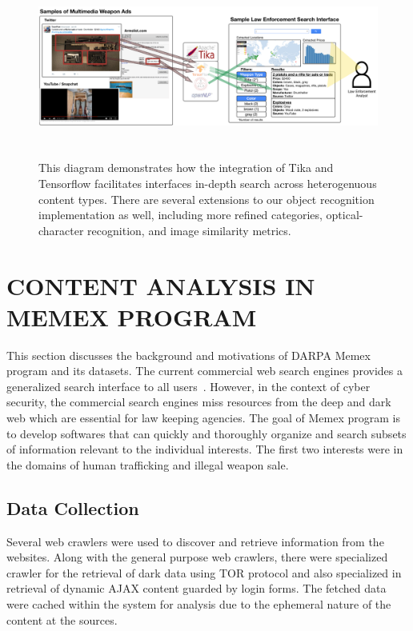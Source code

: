 \begin{figure}
	\includegraphics[width=\textwidth,height=6cm]{interface-diagram}
	\caption{This diagram demonstrates how the integration of Tika and Tensorflow facilitates interfaces in-depth search across heterogenuous content types. There are several extensions to our object recognition implementation as well, including more refined categories, optical-character recognition, and image similarity metrics.}
	\label{fig:interface-diagram}
\end{figure}

\section{CONTENT ANALYSIS IN MEMEX PROGRAM} \label{sec:memex}
This section discusses the background and motivations of DARPA Memex program and its datasets. The current commercial web search engines provides a generalized search interface to all users~\cite{}. However, in the context of cyber security, the commercial search engines miss resources from the deep and dark web which are essential for law keeping agencies. The goal of Memex program is to develop softwares that can quickly and thoroughly organize and search subsets of information relevant to the individual interests. The first two interests were in the domains of human trafficking and illegal weapon sale.

\subsection{Data Collection}
\label{sec:memex-datacollection}
Several web crawlers were used to discover and retrieve information from the websites.
Along with the general purpose web crawlers, there were specialized crawler for the retrieval of dark data using TOR protocol \cite{} and also specialized in retrieval of dynamic AJAX content guarded by login forms. The fetched data were cached within the system for analysis due to the ephemeral nature of the content at the sources.

